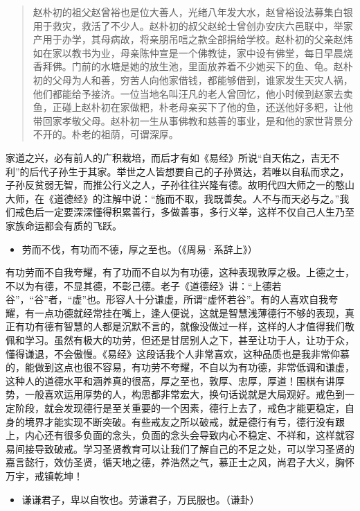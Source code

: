 \begin{quotation}
    赵朴初的祖父赵曾裕也是位大善人，光绪八年发大水，赵曾裕设法募集白银用于救灾，救活了不少人。赵朴初的叔父赵纶士曾创办安庆六邑联中，举家产用于办学，其母病故，将亲朋吊唁之款全部捐给学校。赵朴初的父亲赵炜如在家以教书为业，母亲陈仲宣是一个佛教徒，家中设有佛堂，每日早晨烧香拜佛。门前的水塘是她的放生池，里面放养着不少她买下的鱼、龟。赵朴初的父母为人和善，穷苦人向他家借钱，都能够借到，谁家发生天灾人祸，他们都能给予接济。一位当地名叫汪凡的老人曾回忆，他小时候到赵家去卖鱼，正碰上赵朴初在家做粑，朴老母亲买下了他的鱼，还送他好多粑，让他带回家孝敬父母。赵朴初一生从事佛教和慈善的事业，是和他的家世背景分不开的。朴老的祖荫，可谓深厚。
\end{quotation}

家道之兴，必有前人的广积栽培，而后才有如《易经》所说“自天佑之，吉无不利”的后代子孙生于其家。举世之人皆想要自己的子孙贤达，若唯以自私而求之，子孙反贫弱无智，而推公行义之人，子孙往往兴隆有德。故明代四大师之一的憨山大师，在《道德经》的注解中说：“施而不取，我既善矣。人不与而天必与之。”我们戒色后一定要深深懂得积累善行，多做善事，多行义举，这样不仅自己人生乃至家族命运都会有质的飞跃。

\begin{itemize}\it
    \item 劳而不伐，有功而不德，厚之至也。（《周易·系辞上》）
\end{itemize}

有功劳而不自我夸耀，有了功而不自以为有功德，这种表现敦厚之极。上德之士，不以为有德，不显其德，不彰己德。老子《道德经》讲：“上德若谷”，“谷”者，“虚”也。形容人十分谦虚，所谓“虚怀若谷”。有的人喜欢自我夸耀，有一点功德就经常挂在嘴上，逢人便说，这就是智慧浅薄德行不够的表现，真正有功有德有智慧的人都是沉默不言的，就像没做过一样，这样的人才值得我们敬佩和学习。虽然有极大的功劳，但还是甘居别人之下，甚至让功于人，让功于众，懂得谦退，不会傲慢。《易经》这段话我个人非常喜欢，这种品质也是我非常仰慕的，能做到这点也很不容易，有功劳不夸耀，不自以为有功德，非常低调和谦虚，这种人的道德水平和涵养真的很高，厚之至也，敦厚、忠厚，厚道！围棋有讲厚势，一般喜欢运用厚势的人，构思都非常宏大，换句话说就是大局观好。戒色到一定阶段，就会发现德行是至关重要的一个因素，德行上去了，戒色才能更稳定，自身的境界才能实现不断突破。有些戒友之所以破戒，就是德行有亏，德行没有跟上，内心还有很多负面的念头，负面的念头会导致内心不稳定、不祥和，这样就容易间接导致破戒。学习圣贤教育可以让我们了解自己的不足之处，可以学习圣贤的嘉言懿行，效仿圣贤，循天地之德，养浩然之气，慕正士之风，尚君子大义，胸怀万宇，戒镇乾坤！

\begin{itemize}\it
    \item 谦谦君子，卑以自牧也。劳谦君子，万民服也。（谦卦）
\end{itemize}

